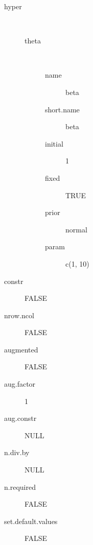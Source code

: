 \begin{description}
	\item[hyper]\ 
	 \begin{description}
	 	\item[theta]\ 
	 	 \begin{description}
	 	 	 \item[ name ] beta 
	 	 	 \item[ short.name ] beta 
	 	 	 \item[ initial ] 1 
	 	 	 \item[ fixed ] TRUE 
	 	 	 \item[ prior ] normal 
	 	 	 \item[ param ] c(1, 10) 
	 	 \end{description}
	 \end{description}
	 \item[ constr ] FALSE 
	 \item[ nrow.ncol ] FALSE 
	 \item[ augmented ] FALSE 
	 \item[ aug.factor ] 1 
	 \item[ aug.constr ] NULL 
	 \item[ n.div.by ] NULL 
	 \item[ n.required ] FALSE 
	 \item[ set.default.values ] FALSE 
\end{description}
